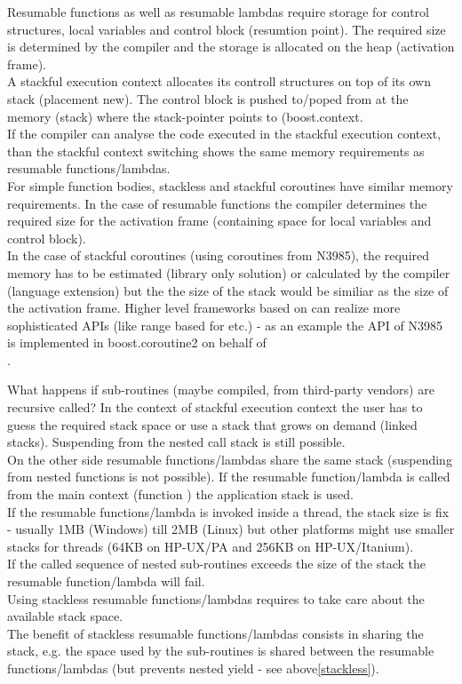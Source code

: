 Resumable functions as well as resumable lambdas require storage for control
structures, local variables and control block (resumtion point). The required
size is determined by the compiler and the storage is allocated on the heap
(activation frame).\\
A stackful execution context allocates its controll structures on top of its own
stack (placement new). The control block is pushed to/poped from at the
memory (stack) where the stack-pointer points to (boost.context\cite{bcontext}.\\
If the compiler can analyse the code executed in the stackful execution context,
than the stackful context switching shows the same memory requirements as
resumable functions/lambdas.\\
\newline
For simple function bodies, stackless and stackful coroutines have similar
memory requirements.
In the case of resumable functions the compiler determines the required size for
the activation frame (containing space for local variables and control block).\\
In the case of stackful coroutines (using coroutines from N3985), the required
memory has to be estimated (library only solution) or calculated by the compiler
(language extension) but the the size of the stack would be similiar as the size
of the activation frame.
Higher level frameworks based on \ectx can realize more sophisticated APIs
(like range based for etc.) - as an example the API of N3985\cite{N3985} is
implemented in boost.coroutine2\cite{bcoroutine2} on behalf of\\
.

What happens if sub-routines (maybe compiled, from third-party vendors) are
recursive called? In the context of stackful execution context
the user has to guess the required stack space or use a stack that grows on
demand (linked stacks). Suspending from the nested call stack is still
possible.\\
On the other side resumable functions/lambdas share the same stack (suspending
from nested functions is not possible). If the resumable function/lambda is
called from the main context (function \main) the application stack is used.\\
If the resumable functions/lambda is invoked inside a thread, the stack size is
fix - usually 1MB (Windows) till 2MB (Linux) but other platforms might use
smaller stacks for threads (64KB on HP-UX/PA and 256KB on HP-UX/Itanium).\\
If the called sequence of nested sub-routines exceeds the size of the stack the
resumable function/lambda will fail.\\
\newline
Using stackless resumable functions/lambdas requires to take care about the
available stack space.\\
The benefit of stackless resumable functions/lambdas consists in sharing the
stack, e.g. the space used by the sub-routines is shared between the resumable
functions/lambdas (but prevents nested yield - see above\ref{stackless}).

